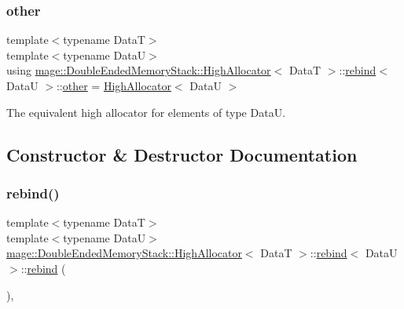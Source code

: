 \subsubsection{\texorpdfstring{other}{other}}
{\footnotesize\ttfamily template$<$typename DataT$>$ \\
template$<$typename DataU$>$ \\
using \hyperlink{structmage_1_1_double_ended_memory_stack_1_1_high_allocator}{mage\+::\+Double\+Ended\+Memory\+Stack\+::\+High\+Allocator}$<$ DataT $>$\+::\hyperlink{structmage_1_1_double_ended_memory_stack_1_1_high_allocator_1_1rebind}{rebind}$<$ DataU $>$\+::\hyperlink{structmage_1_1_double_ended_memory_stack_1_1_high_allocator_1_1rebind_aee127399c76826ea9b23986ee10f19fa}{other} =  \hyperlink{structmage_1_1_double_ended_memory_stack_1_1_high_allocator}{High\+Allocator}$<$ DataU $>$}

The equivalent high allocator for elements of type {\ttfamily DataU}. 

\subsection{Constructor \& Destructor Documentation}
\hypertarget{structmage_1_1_double_ended_memory_stack_1_1_high_allocator_1_1rebind_ae8b23efa6f7435efbab9add1ce097c99}{}\label{structmage_1_1_double_ended_memory_stack_1_1_high_allocator_1_1rebind_ae8b23efa6f7435efbab9add1ce097c99} 
\subsubsection{\texorpdfstring{rebind()}{rebind()}\hspace{0.1cm}{\footnotesize\ttfamily [1/3]}}
{\footnotesize\ttfamily template$<$typename DataT$>$ \\
template$<$typename DataU$>$ \\
\hyperlink{structmage_1_1_double_ended_memory_stack_1_1_high_allocator}{mage\+::\+Double\+Ended\+Memory\+Stack\+::\+High\+Allocator}$<$ DataT $>$\+::\hyperlink{structmage_1_1_double_ended_memory_stack_1_1_high_allocator_1_1rebind}{rebind}$<$ DataU $>$\+::\hyperlink{structmage_1_1_double_ended_memory_stack_1_1_high_allocator_1_1rebind}{rebind} (\begin{DoxyParamCaption}{ }\end{DoxyParamCaption})\hspace{0.3cm}{\ttfamily [private]}, {\ttfamily [delete]}}

